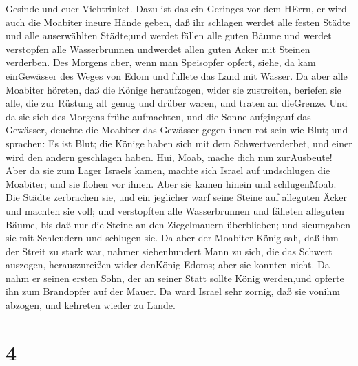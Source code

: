 Gesinde und euer Viehtrinket.  Dazu ist das ein Geringes
vor dem HErrn, er wird auch die Moabiter ineure Hände geben,
 daß ihr schlagen werdet alle festen Städte und alle
auserwählten Städte;und werdet fällen alle guten Bäume und werdet
verstopfen alle Wasserbrunnen undwerdet allen guten Acker mit Steinen
verderben.  Des Morgens aber, wenn man Speisopfer opfert,
siehe, da kam einGewässer des Weges von Edom und füllete das Land mit
Wasser.  Da aber alle Moabiter höreten, daß die Könige
heraufzogen, wider sie zustreiten, beriefen sie alle, die zur Rüstung
alt genug und drüber waren, und traten an dieGrenze.  Und
da sie sich des Morgens frühe aufmachten, und die Sonne aufgingauf das
Gewässer, deuchte die Moabiter das Gewässer gegen ihnen rot sein wie
Blut;  und sprachen: Es ist Blut; die Könige haben sich mit
dem Schwertverderbet, und einer wird den andern geschlagen haben. Hui,
Moab, mache dich nun zurAusbeute!  Aber da sie zum Lager
Israels kamen, machte sich Israel auf undschlugen die Moabiter; und sie
flohen vor ihnen. Aber sie kamen hinein und schlugenMoab. 
Die Städte zerbrachen sie, und ein jeglicher warf seine Steine auf
alleguten Äcker und machten sie voll; und verstopften alle Wasserbrunnen
und fälleten alleguten Bäume, bis daß nur die Steine an den Ziegelmauern
überblieben; und sieumgaben sie mit Schleudern und schlugen sie.
 Da aber der Moabiter König sah, daß ihm der Streit zu
stark war, nahmer siebenhundert Mann zu sich, die das Schwert auszogen,
herauszureißen wider denKönig Edoms; aber sie konnten nicht.
 Da nahm er seinen ersten Sohn, der an seiner Statt sollte
König werden,und opferte ihn zum Brandopfer auf der Mauer. Da ward
Israel sehr zornig, daß sie vonihm abzogen, und kehreten wieder zu
Lande.

\hypertarget{section-3}{%
\section{4}\label{section-3}}


